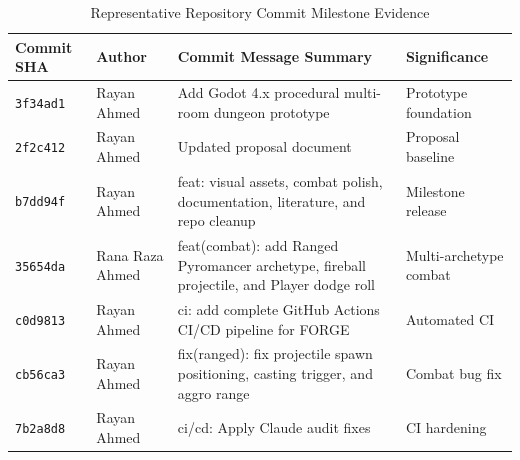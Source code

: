 \begin{table}[!htbp]
\centering
\caption{Representative Repository Commit Milestone Evidence}
\label{tab:commit_evidence}
\small
\begin{tabular}{p{}p{}p{}p{}}
\toprule
\textbf{Commit SHA} & \textbf{Author} & \textbf{Commit Message Summary} & \textbf{Significance} \\
\midrule
\texttt{3f34ad1} & Rayan Ahmed & Add Godot 4.x procedural multi-room dungeon prototype & Prototype foundation \\
\texttt{2f2c412} & Rayan Ahmed & Updated proposal document & Proposal baseline \\
\texttt{b7dd94f} & Rayan Ahmed & feat: visual assets, combat polish, documentation, literature, and repo cleanup & Milestone release \\
\texttt{35654da} & Rana Raza Ahmed & feat(combat): add Ranged Pyromancer archetype, fireball projectile, and Player dodge roll & Multi-archetype combat \\
\texttt{c0d9813} & Rayan Ahmed & ci: add complete GitHub Actions CI/CD pipeline for FORGE & Automated CI \\
\texttt{cb56ca3} & Rayan Ahmed & fix(ranged): fix projectile spawn positioning, casting trigger, and aggro range & Combat bug fix \\
\texttt{7b2a8d8} & Rayan Ahmed & ci/cd: Apply Claude audit fixes & CI hardening \\
\bottomrule
\end{tabular}
\end{table}

